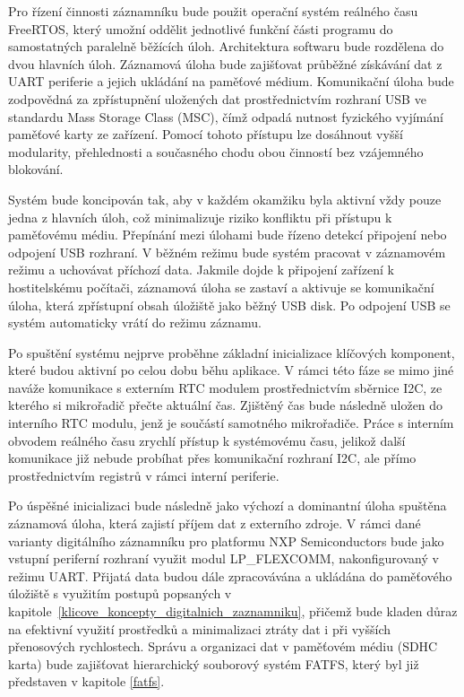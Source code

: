 Pro řízení činnosti záznamníku bude použit operační systém reálného času FreeRTOS, který umožní oddělit jednotlivé funkční části programu do samostatných paralelně běžících úloh. Architektura softwaru bude rozdělena do dvou hlavních úloh. Záznamová úloha bude zajišťovat průběžné získávání dat z UART periferie a jejich ukládání na paměťové médium. Komunikační úloha bude zodpovědná za zpřístupnění uložených dat prostřednictvím rozhraní USB ve standardu Mass Storage Class (MSC), čímž odpadá nutnost fyzického vyjímání paměťové karty ze zařízení. Pomocí tohoto přístupu lze dosáhnout vyšší modularity, přehlednosti a současného chodu obou činností bez vzájemného blokování.

Systém bude koncipován tak, aby v každém okamžiku byla aktivní vždy pouze jedna z hlavních úloh, což minimalizuje riziko konfliktu při přístupu k paměťovému médiu. Přepínání mezi úlohami bude řízeno detekcí připojení nebo odpojení USB rozhraní. V běžném režimu bude systém pracovat v záznamovém režimu a uchovávat příchozí data. Jakmile dojde k připojení zařízení k hostitelskému počítači, záznamová úloha se zastaví a aktivuje se komunikační úloha, která zpřístupní obsah úložiště jako běžný USB disk. Po odpojení USB se systém automaticky vrátí do režimu záznamu.

Po spuštění systému nejprve proběhne základní inicializace klíčových komponent, které budou aktivní po celou dobu běhu aplikace. V rámci této fáze se mimo jiné naváže komunikace s externím RTC modulem prostřednictvím sběrnice I2C, ze kterého si mikrořadič přečte aktuální čas. Zjištěný čas bude následně uložen do interního RTC modulu, jenž je součástí samotného mikrořadiče. Práce s interním obvodem reálného času zrychlí přístup k systémovému času, jelikož další komunikace již nebude probíhat přes komunikační rozhraní I2C, ale přímo prostřednictvím registrů v rámci interní periferie.

Po úspěšné inicializaci bude následně jako výchozí a dominantní úloha spuštěna záznamová úloha, která zajistí příjem dat z externího zdroje. V rámci dané varianty digitálního záznamníku pro platformu NXP Semiconductors bude jako vstupní periferní rozhraní využit modul LP\_FLEXCOMM, nakonfigurovaný v režimu UART. Přijatá data budou dále zpracovávána a ukládána do paměťového úložiště s využitím postupů popsaných v kapitole~\ref{klicove_koncepty_digitalnich_zaznamniku}, přičemž bude kladen důraz na efektivní využití prostředků a minimalizaci ztráty dat i při vyšších přenosových rychlostech. Správu a organizaci dat v paměťovém médiu (SDHC karta) bude zajišťovat hierarchický souborový systém FATFS, který byl již představen v kapitole \ref{fatfs}.

